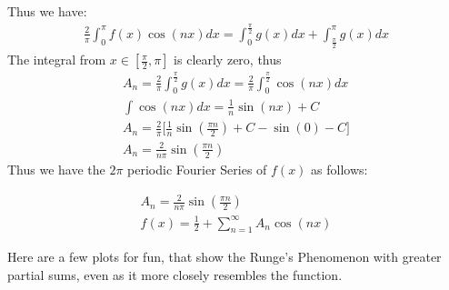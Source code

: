 \documentclass{article}
\begin{document}
Thus we have:
\begin{equation}
\begin{aligned}
\frac{2}{\pi}\int_0^{\pi}f(x)\cos(nx)dx =\int_{0}^{\frac{\pi}{2}}g(x)dx + \int_{\frac{\pi}{2}}^{\pi}g(x)dx
\end{aligned}
\end{equation}
The integral from $x \in [\frac{\pi}{2}, \pi]$ is clearly zero, thus
\begin{equation}
\begin{aligned}
A_n =\frac{2}{\pi} \int_{0}^{\frac{\pi}{2}}g(x)dx = \frac{2}{\pi}\int_{0}^{\frac{\pi}{2}}\cos(nx)dx\\
\int \cos(nx)dx = \frac{1}{n}\sin(nx) + C\\
A_n = \frac{2}{\pi} \Big[\frac{1}{n}\sin(\frac{\pi n}{2}) + C - \sin(0) - C \Big]\\
A_n = \frac{2}{n\pi}\sin(\frac{\pi n}{2})
\end{aligned}
\end{equation}
Thus we have the $2\pi$ periodic Fourier Series of $f(x)$ as follows:
\begin{tcolorbox}[minipage,colback=white,arc=0pt,outer arc=0pt]
\begin{equation}
\begin{aligned}
A_n = \frac{2}{n\pi}\sin(\frac{\pi n}{2})\\
f(x) = \frac{1}{2} + \sum_{n=1}^{\infty} A_n\cos(nx)
\end{aligned}
\end{equation}
\end{tcolorbox}
Here are a few plots for fun, that show the Runge's Phenomenon with greater partial sums, even as it more closely resembles the function.
\end{document}
